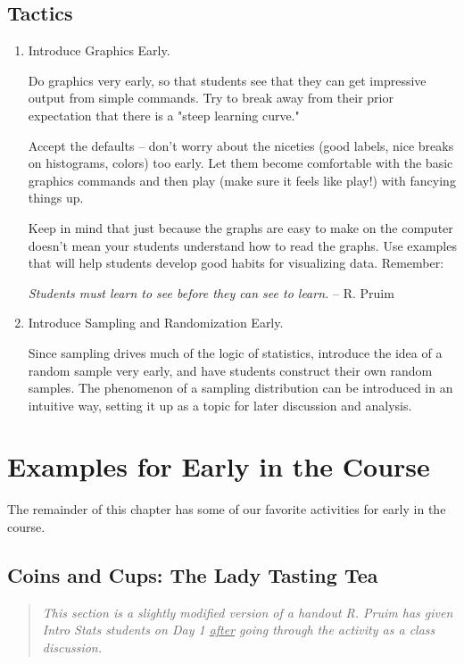 \subsection{Tactics}

\begin{enumerate}
\item
Introduce Graphics Early.


Do graphics very early, so that students see that they can get
impressive output from simple commands.  Try to break away from their
prior expectation that there is a "steep learning curve."

Accept the defaults -- don't worry about the niceties (good labels,
nice breaks on histograms, colors) too early.  Let them become
comfortable with the basic graphics commands and then play (make sure
it feels like play!) with fancying things up.  

Keep in mind that just because the graphs are easy to make on the computer doesn't 
mean your students understand how to read the graphs.  
Use examples that will
help students develop good habits for visualizing data.  Remember:

\begin{center}
\emph{
Students must learn to see before they can see to learn.}  -- R. Pruim
\end{center}

\item Introduce Sampling and Randomization Early.

Since sampling drives much of the logic of statistics, introduce the idea of a random sample very
early, and have students construct their own random samples.  The
phenomenon of a sampling distribution can be introduced in an
intuitive way, setting it up as a topic for later discussion and analysis.


\end{enumerate}

\section{ Examples for Early in the Course }
The remainder of this chapter has some of our favorite activities for early 
in the course.  


\subsection{Coins and Cups: The Lady Tasting Tea}

\begin{quote}
\emph{This section is a slightly modified version of a handout R. Pruim
has given Intro Stats students on Day 1 \underline{after} going through
the activity as a class discussion.  
}
\end{quote}


